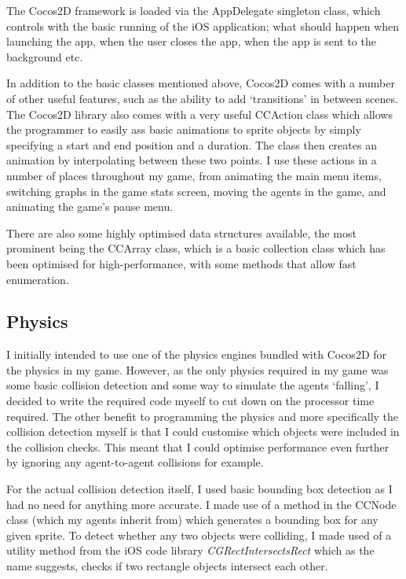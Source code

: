 \documentclass[a4paper,oneside]{report}
\begin{document}
The Cocos2D framework is loaded via the AppDelegate singleton class, which controls with the basic running of the iOS application; what should happen when launching the app, when the user closes the app, when the app is sent to the background etc.

In addition to the basic classes mentioned above, Cocos2D comes with a number of other useful features, such as the ability to add `transitions' in between scenes. The Cocos2D library also comes with a very useful CCAction class which allows the programmer to easily ass basic animations to sprite objects by simply specifying a start and end position and a duration. The class then creates an animation by interpolating between these two points. I use these actions in a number of places throughout my game, from animating the main menu items, switching graphs in the game stats screen, moving the agents in the game, and animating the game's pause menu. 

There are also some highly optimised data structures available, the most prominent being the CCArray class, which is a basic collection class which has been optimised for high-performance, with some methods that allow fast enumeration.

\subsection{Physics}

I initially intended to use one of the physics engines bundled with Cocos2D for the physics in my game. However, as the only physics required in my game was some basic collision detection and some way to simulate the agents `falling', I decided to write the required code myself to cut down on the processor time required. The other benefit to programming the physics and more specifically the collision detection myself is that I could customise which objects were included in the collision checks. This meant that I could optimise performance even further by ignoring any agent-to-agent collisions for example.

For the actual collision detection itself, I used basic bounding box detection as I had no need for anything more accurate. I made use of a method in the CCNode class (which my agents inherit from) which generates a bounding box for any given sprite. To detect whether any two objects were colliding, I made used of a utility method from the iOS code library \emph{CGRectIntersectsRect} which as the name suggests, checks if two rectangle objects intersect each other.
\end{document}
